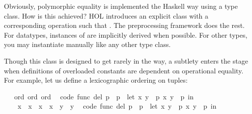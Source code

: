 \begin{isabellebody}
\isamarkuptrue%
%
\begin{isamarkuptext}%
Obviously, polymorphic equality is implemented the Haskell
  way using a type class.  How is this achieved?  HOL introduces
  an explicit class  with a corresponding operation
   such that .
  The preprocessing framework does the rest.
  For datatypes, instances of  are implicitly derived
  when possible.  For other types, you may instantiate 
  manually like any other type class.

  Though this  class is designed to get rarely in
  the way, a subtlety
  enters the stage when definitions of overloaded constants
  are dependent on operational equality.  For example, let
  us define a lexicographic ordering on tuples:%
\end{isamarkuptext}%
\isamarkuptrue%
\isamarkupfalse%
\ {\isacharasterisk}\ {\isacharcolon}{\isacharcolon}\ {\isacharparenleft}ord{\isacharcomma}\ ord{\isacharparenright}\ ord\isanewline
{}\isanewline
\isanewline
{}\isamarkupfalse%
\isanewline
\ \ {\isacharbrackleft}code\ func\ del{\isacharbrackright}{\isacharcolon}\ {\isachardoublequoteopen}p{}\ {\isacharless}\ p{}\ {\isasymlongleftrightarrow}\ {\isacharparenleft}let\ {\isacharparenleft}x{}{\isacharcomma}\ y{}{\isacharparenright}\ {\isacharequal}\ p{}{\isacharsemicolon}\ {\isacharparenleft}x{}{\isacharcomma}\ y{}{\isacharparenright}\ {\isacharequal}\ p{}\ in\isanewline
\ \ \ \ x{}\ {\isacharless}\ x{}\ {\isasymor}\ {\isacharparenleft}x{}\ {\isacharequal}\ x{}\ {\isasymand}\ y{}\ {\isacharless}\ y{}{\isacharparenright}{\isacharparenright}{\isachardoublequoteclose}\isanewline
\isanewline
{}\isamarkupfalse%
\isanewline
\ \ {\isacharbrackleft}code\ func\ del{\isacharbrackright}{\isacharcolon}\ {\isachardoublequoteopen}p{}\ {\isasymle}\ p{}\ {\isasymlongleftrightarrow}\ {\isacharparenleft}let\ {\isacharparenleft}x{}{\isacharcomma}\ y{}{\isacharparenright}\ {\isacharequal}\ p{}{\isacharsemicolon}\ {\isacharparenleft}x{}{\isacharcomma}\ y{}{\isacharparenright}\ {\isacharequal}\ p{}\ in\isanewline

\end{isabellebody}
